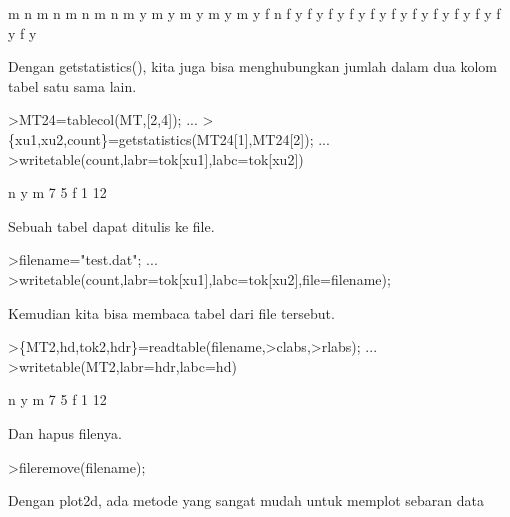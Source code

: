 \documentclass{article}
\begin{document}
\begin{eulernotebook}
\begin{eulercomment}
\begin{eulercomment}
\begin{euleroutput}
           m         n
           m         n
           m         n
           m         n
           m         y
           m         y
           m         y
           m         y
           m         y
           f         n
           f         y
           f         y
           f         y
           f         y
           f         y
           f         y
           f         y
           f         y
           f         y
           f         y
           f         y
           f         y
\end{euleroutput}
\begin{eulercomment}
Dengan getstatistics(), kita juga bisa menghubungkan jumlah dalam dua
kolom tabel satu sama lain.
\end{eulercomment}
\begin{eulerprompt}
>MT24=tablecol(MT,[2,4]); ...
>\{xu1,xu2,count\}=getstatistics(MT24[1],MT24[2]); ...
>writetable(count,labr=tok[xu1],labc=tok[xu2])
\end{eulerprompt}
\begin{euleroutput}
                     n         y
           m         7         5
           f         1        12
\end{euleroutput}
\begin{eulercomment}
Sebuah tabel dapat ditulis ke file.
\end{eulercomment}
\begin{eulerprompt}
>filename="test.dat"; ...
>writetable(count,labr=tok[xu1],labc=tok[xu2],file=filename);
\end{eulerprompt}
\begin{eulercomment}
Kemudian kita bisa membaca tabel dari file tersebut.
\end{eulercomment}
\begin{eulerprompt}
>\{MT2,hd,tok2,hdr\}=readtable(filename,>clabs,>rlabs); ...
>writetable(MT2,labr=hdr,labc=hd)
\end{eulerprompt}
\begin{euleroutput}
                     n         y
           m         7         5
           f         1        12
\end{euleroutput}
\begin{eulercomment}
Dan hapus filenya.
\end{eulercomment}
\begin{eulerprompt}
>fileremove(filename);
\end{eulerprompt}
\begin{eulercomment}
Dengan plot2d, ada metode yang sangat mudah untuk memplot sebaran data

\end{eulercomment}
\end{eulercomment}
\end{eulercomment}
\end{eulernotebook}
\end{document}
